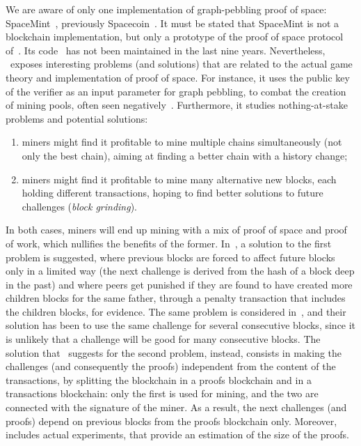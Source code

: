 We are aware of only one implementation of graph-pebbling proof of space:
SpaceMint~\cite{ParkKFGAP18}, previously Spacecoin~\cite{ParkPAFG15}.
It must be stated that SpaceMint is not a blockchain implementation,
but only a prototype of the proof of space protocol of~\cite{DziembowskiFKP15}.
Its code~\cite{SpaceMintCode} has not been maintained in the last nine years.
Nevertheless, \cite{ParkKFGAP18}~exposes interesting problems (and solutions)
that are related to the actual game theory and implementation of proof of space.
For instance, it uses the public key of the verifier as an input parameter
for graph pebbling, to combat the creation of mining pools, often seen
negatively~\cite{MillerKKS15}.
Furthermore, it studies nothing-at-stake problems and potential solutions:
%
\begin{enumerate}
\item miners might find it profitable to mine multiple chains simultaneously (not only the best chain),
  aiming at finding a better chain with a history change;
\item miners might find it profitable to mine many alternative new blocks, each holding
  different transactions, hoping to find better solutions to future challenges (\emph{block grinding}).
\end{enumerate}
%
In both cases, miners will end up mining with a mix of proof of space and proof of work,
which nullifies the benefits of the former.
In~\cite{ParkKFGAP18}, a solution to the first problem is suggested, where
previous blocks are forced to affect future blocks only in a limited way
(the next challenge is derived from the hash of a block deep in the past)
and where peers get punished if they are found to have
created more children blocks for the same father, through a penalty transaction that
includes the children blocks, for evidence.
The same problem is considered in~\cite{CohenP19}, and their solution has been
to use the same challenge for several consecutive blocks, since it is
unlikely that a challenge will be good for many consecutive blocks.
The solution that~\cite{ParkKFGAP18} suggests
for the second problem, instead, consists in making the challenges
(and consequently the proofs) independent from the content of the transactions, by splitting the
blockchain in a proofs blockchain and in a transactions blockchain: only the first is used for mining,
and the two are connected with the signature of the miner.
As a result, the next challenges (and proofs) depend on previous blocks from the proofs blockchain only.
Moreover, \cite{ParkKFGAP18} includes actual experiments, that provide an estimation of the size of the proofs.
